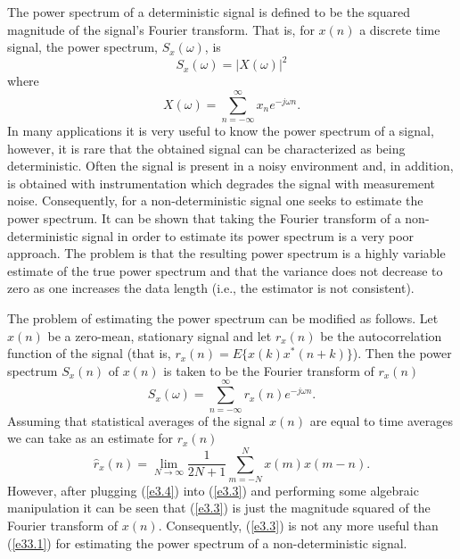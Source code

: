 	The power spectrum of a deterministic signal
is defined to be the squared magnitude of the signal's Fourier
transform.  That is, for $x(n)$ a discrete time signal, the power spectrum,
$S_x(\omega)$, is 
%
\begin{equation}
     S_x(\omega)=|X(\omega)|^2
\label{e33.1}
\end{equation}
%
where
%
\begin{equation}
     X(\omega)=\sum_{n=-\infty}^{\infty}x_ne^{-j\omega n}.
\label{e3.2}
\end{equation}
%
In many applications it is very useful to know
the power spectrum of a signal, however, it is
rare that the obtained signal can be characterized as being
deterministic.  Often the signal is present in a noisy
environment and, in addition, is obtained with instrumentation
which degrades the signal with measurement noise.  Consequently, for a 
non-deterministic signal one seeks to estimate the power spectrum.
It can be shown \cite{oppen} that taking
the Fourier transform of a non-deterministic
signal in order to estimate its power spectrum is a very poor
approach.  The problem is that the resulting power spectrum
is a highly variable estimate of the true power spectrum
and that the variance does not decrease to zero as one
increases the data length (i.e., the estimator is not consistent).

	The problem of estimating the power spectrum
can be modified as follows.  Let
$x(n)$ be a zero-mean, stationary signal and let $r_x(n)$ be the autocorrelation
function of the signal (that is, $r_x(n)=E\{x(k)x^*(n+k)\}$).
Then the power spectrum $S_x(n)$ of $x(n)$ is taken to be the Fourier transform
of $r_x(n)$
%
\begin{equation}
     S_x(\omega)=\sum_{n=-\infty}^{\infty}r_x(n)e^{-j\omega n}.
\label{e3.3}
\end{equation}
%
Assuming that statistical averages of the signal $x(n)$ are equal to
time averages we can take as an estimate for $r_x(n)$
%
\begin{equation}
     \hat{r}_x(n)=\lim_{N\rightarrow\infty}\frac{1}{2N+1}\sum_{m=-N}^{N}x(m)x(m-n).
\label{e3.4}
\end{equation}
%
However, after plugging (\ref{e3.4}) into (\ref{e3.3}) and performing some
algebraic manipulation it can be seen that (\ref{e3.3}) is just
the magnitude squared of the Fourier transform of $x(n)$.
Consequently, (\ref{e3.3}) is not any more useful than (\ref{e33.1}) for estimating the
power spectrum of a non-deterministic signal.

